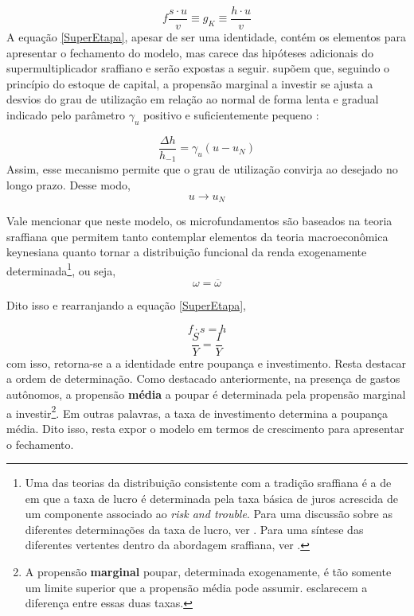 \begin{equation}
\label{SuperEtapa}
f\frac{s\cdot u}{v} \equiv g_K \equiv \frac{h\cdot u}{v}    
\end{equation}
A equação \ref{SuperEtapa}, apesar de ser uma identidade, contém os elementos para apresentar o fechamento do modelo, mas carece das hipóteses adicionais do supermultiplicador sraffiano e serão expostas a seguir. \textcite{freitas_growth_2015} supõem que, seguindo o princípio do estoque de capital, a propensão marginal a investir se ajusta a desvios do grau de utilização em relação ao normal de forma lenta e gradual indicado pelo parâmetro $\gamma_u$ positivo e suficientemente pequeno \cite[p.~271]{freitas_growth_2015}:

$$
\frac{\Delta h}{h_{-1}} = \gamma_u (u - u_N)
$$
Assim, esse mecanismo permite que o grau de utilização convirja ao desejado no longo prazo. Desse modo,
$$
u \to u_N
$$

Vale mencionar que neste modelo, os microfundamentos são baseados na teoria sraffiana que permitem tanto contemplar elementos da teoria macroeconômica keynesiana quanto tornar a distribuição funcional da renda exogenamente determinada\footnote{
	Uma das teorias da distribuição consistente com a tradição sraffiana é a de \textcite{pivetti_essay_1992} em que a taxa de lucro é determinada pela taxa básica de juros acrescida de um componente associado ao \textit{risk and trouble}.
	Para uma discussão sobre as diferentes determinações da taxa de lucro, ver \textcite{serrano_teoria_1988}.
	Para uma síntese das diferentes vertentes dentro da abordagem sraffiana, ver \textcite{aspromourgos_sraffian_2004}.
}, ou seja,
$$
\omega = \overline \omega
$$

Dito isso e rearranjando a equação \ref{SuperEtapa}, 

$$
f\cdot s = h
$$
$$
\frac{S}{Y} = \frac{I}{Y}
$$
com isso, retorna-se a a identidade entre poupança e investimento. Resta destacar a ordem de determinação. Como destacado anteriormente, na presença de gastos autônomos, a propensão \textbf{média} a poupar é determinada pela propensão marginal a investir\footnote{A propensão \textbf{marginal} poupar, determinada exogenamente, é tão somente um limite superior que a propensão média pode assumir. \textcite[p.~51--52]{serrano_o_2000} esclarecem a diferença entre essas duas taxas.}. Em outras palavras, a taxa de investimento determina a poupança média.
Dito isso, resta expor o modelo em termos de crescimento para apresentar o fechamento.


